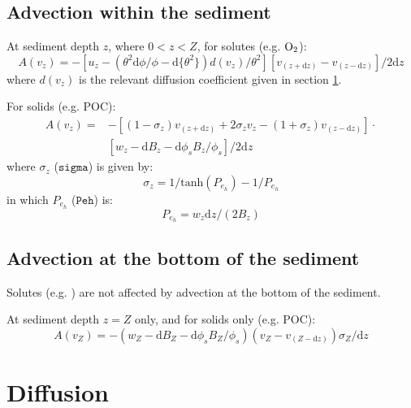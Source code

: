 \documentclass[a4paper]{article}
\newcommand{\D}[1]{\mathrm{d}#1}
\newcommand{\code}[1]{\texttt{#1}}
\begin{document}
\subsection{Advection within the sediment}

At sediment depth $z$, where $0 < z < Z$, for solutes (e.g. $\ce{O2}$):
\begin{equation}
A(v_z) = -[u_z - (\theta^2 \D{\phi} / \phi - \D{\{\theta^2\}}) d(v_z) / \theta^2] [v_{(z+\D{z})} - v_{(z-\D{z})}] / 2 \D{z}
\end{equation}
where $d(v_z)$ is the relevant diffusion coefficient given in section \ref{sx:diffusion}.

For solids (e.g. POC):
\begin{equation}
\begin{split}
A(v_z) = & -[(1 - \sigma_z) v_{(z+\D{z})} + 2 \sigma_z v_z - (1 + \sigma_z) v_{(z-\D{z})}] \cdot \\
& [w_z - \D{B_z} - \D{\phi_s} B_z / \phi_s] / 2 \D{z}
\end{split}
\end{equation}
where $\sigma_z$ ($\code{sigma}$) is given by:
\begin{equation}
\sigma_z = 1 / \mathrm{tanh}(P_{e_h}) - 1 / P_{e_h}
\end{equation}
in which $P_{e_h}$ ($\code{Peh}$) is:
\begin{equation}
P_{e_h} = w_z \D{z} / (2 B_z)
\end{equation}

\subsection{Advection at the bottom of the sediment}\label{sx:adv_bot}

Solutes (e.g. ) are not affected by advection at the bottom of the sediment.

At sediment depth $z = Z$ only, and for solids only (e.g. POC):
\begin{equation}
A(v_Z) = -(w_Z - \D{B_Z} - \D{\phi_s} B_Z / \phi_s) (v_Z - v_{(Z-\D{z})}) \sigma_Z / \D{z}
\end{equation}


\section{Diffusion}\label{sx:diffusion}
\end{document}
